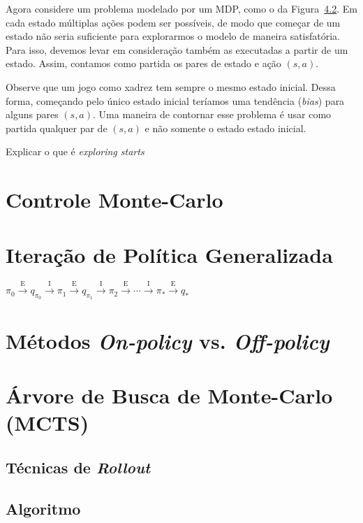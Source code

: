 \documentclass{article}
\begin{document}
        Agora considere um problema modelado por um MDP, como o da Figura~\ref{}. Em cada estado múltiplas ações podem ser possíveis, de modo que começar de um estado não seria suficiente para explorarmos o modelo de maneira satisfatória. Para isso, devemos levar em consideração também as executadas a partir de um estado. Assim, contamos como partida os pares de estado e ação $(s, a)$.
        
        Observe que um jogo como xadrez tem sempre o mesmo estado inicial. Dessa forma, começando pelo único estado inicial teríamos uma tendência (\emph{bias}) para alguns pares $(s, a)$. Uma maneira de contornar esse problema é usar como partida qualquer par de $(s, a)$ e não somente o estado estado inicial.
    
        Explicar o que é \textit{exploring starts}
    
    \section{Controle Monte-Carlo}
    
    \section{Iteração de Política Generalizada}
    
        \begin{center}
            \begin{math}
                \pi_0 \xrightarrow{\ \textrm{E} \ } 
                q_{\pi_0} \xrightarrow{\ \textrm{I} \ } 
                \pi_1 \xrightarrow{\ \textrm{E} \ } 
                q_{\pi_1} \xrightarrow{\ \textrm{I} \ } 
                \pi_2 \xrightarrow{\ \textrm{E} \ } 
                \cdots \xrightarrow{\ \textrm{I} \ }
                \pi_* \xrightarrow{\ \textrm{E} \ } q_{*}
            \end{math}
        \end{center}
    
    \section{Métodos \textit{On-policy} vs. \textit{Off-policy}}
    
    \section{Árvore de Busca de Monte-Carlo (MCTS)}
    
        \subsection{Técnicas de \textit{Rollout}}
        
        \subsection{Algoritmo}
\end{document}
